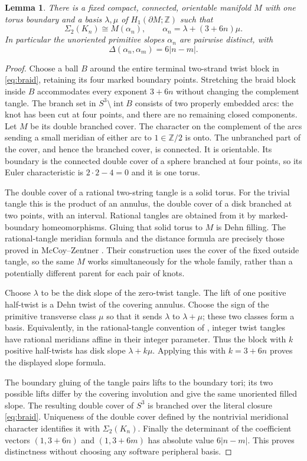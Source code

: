 \documentclass[11pt]{article}
\newtheorem{lemma}[theorem]{Lemma}
\newcommand{\Sig}{\Sigma_2}
\begin{document}
\begin{lemma}\label{lem:tangle}
There is a fixed compact, connected, orientable manifold $M$ with one
torus boundary and a basis $\lambda,\mu$ of $H_1(\partial M;\mathbb Z)$
such that
\[
 \Sig(K_n)\cong M(\alpha_n),\qquad
 \alpha_n=\lambda+(3+6n)\mu.
\]
In particular the unoriented primitive slopes $\alpha_n$ are pairwise
distinct, with
\[
                    \Delta(\alpha_n,\alpha_m)=6|n-m|.
\]
\end{lemma}
\begin{proof}
Choose a ball $B$ around the entire terminal two-strand twist block in
\eqref{eq:braid}, retaining its four marked boundary points.
Stretching the braid block inside $B$ accommodates every exponent
$3+6n$ without changing the complement tangle. The branch set in
$S^3\setminus\operatorname{int}B$ consists of two properly embedded
arcs: the knot has been cut at four points, and there are no remaining
closed components. Let $M$ be its double branched cover.
The character on the complement of the arcs sending a small meridian
of either arc to $1\in\mathbb Z/2$ is onto. The unbranched part of the
cover, and hence the branched cover, is connected. It is orientable.
Its boundary is the connected double cover of a sphere branched at
four points, so its Euler characteristic is $2\cdot2-4=0$ and it is
one torus.

The double cover of a rational two-string tangle is a solid torus.
For the trivial tangle this is the product of an annulus, the double
cover of a disk branched at two points, with an interval. Rational
tangles are obtained from it by marked-boundary homeomorphisms.
Gluing that solid torus to $M$ is Dehn filling. The rational-tangle
meridian formula and the distance formula are precisely those proved
in McCoy--Zentner \cite[Lemma~12 and its proof, p.~7]{mz}.
Their construction uses the cover of the fixed outside tangle, so the
same $M$ works simultaneously for the whole family, rather than a
potentially different parent for each pair of knots.

Choose $\lambda$ to be the disk slope of the zero-twist tangle.
The lift of one positive half-twist is a Dehn twist of the covering
annulus. Choose the sign of the primitive transverse class $\mu$
so that it sends $\lambda$ to $\lambda+\mu$; these two classes form
a basis. Equivalently, in the rational-tangle convention of
\cite[Figure~5 and Lemma~12]{mz}, integer twist tangles have rational
meridians affine in their integer parameter. Thus the block with $k$
positive half-twists has disk slope $\lambda+k\mu$. Applying this
with $k=3+6n$ proves the displayed slope formula.

The boundary gluing of the tangle pairs lifts to the boundary tori;
its two possible lifts differ by the covering involution and give the
same unoriented filled slope. The resulting double cover of $S^3$
is branched over the literal closure \eqref{eq:braid}. Uniqueness of
the double cover defined by the nontrivial meridional character
identifies it with $\Sig(K_n)$.
Finally the determinant of the coefficient vectors $(1,3+6n)$ and
$(1,3+6m)$ has absolute value $6|n-m|$. This proves distinctness
without choosing any software peripheral basis.
\end{proof}
\end{document}

